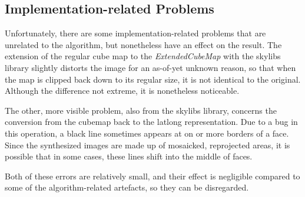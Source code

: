 \subsection{Implementation-related Problems}\label{subsec:bugs}
Unfortunately, there are some implementation-related problems that are unrelated to the algorithm, but nonetheless have an effect on the result. The extension of the regular cube map to the \emph{ExtendedCubeMap} with the skylibs library slightly distorts the image for an as-of-yet unknown reason, so that when the map is clipped back down to its regular size, it is not identical to the original. Although the difference not extreme, it is nonetheless noticeable.

The other, more visible problem, also from the skylibs library, concerns the conversion from the cubemap back to the latlong representation. Due to a bug in this operation, a black line sometimes appears at on or more borders of a face. Since the synthesized images are made up of mosaicked, reprojected areas, it is possible that in some cases, these lines shift into the middle of faces.

Both of these errors are relatively small, and their effect is negligible compared to some of the algorithm-related artefacts, so they can be disregarded.
